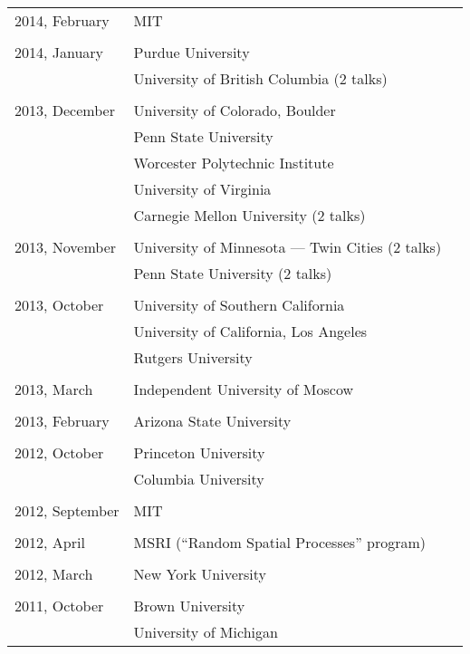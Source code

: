 \documentclass[letterpaper,11pt]{article}
\begin{document}
\begin{longtable}{llc}
  2014, February
  & MIT\\\\

  2014, January 
  & Purdue University &\hspace{110pt}
  \\& University of British Columbia (2 talks)\\\\
  
  2013, December
  & University of Colorado, Boulder
  \\&Penn State University\\&Worcester Polytechnic Institute
  \\&University of Virginia\\&
  Carnegie Mellon University (2 talks)\\\\
  
  2013, November&
  University of Minnesota --- Twin Cities (2 talks)\\&
  Penn State University (2 talks)\\\\

  2013, October&
  University of Southern California 
  \\&
  University of California, Los Angeles
  \\&Rutgers University\\\\
  
  2013, March& Independent University of Moscow\\\\

  2013, February & Arizona State University\\\\

  2012, October & Princeton University \\
  & Columbia University\\\\

  2012, September & MIT \\\\ 

  2012, April & MSRI (``Random Spatial Processes'' program)\\\\

  2012, March & New York University\\\\

  2011, October & Brown University \\
  &University of Michigan
  \\
\end{longtable}
\bigskip
\end{document}
